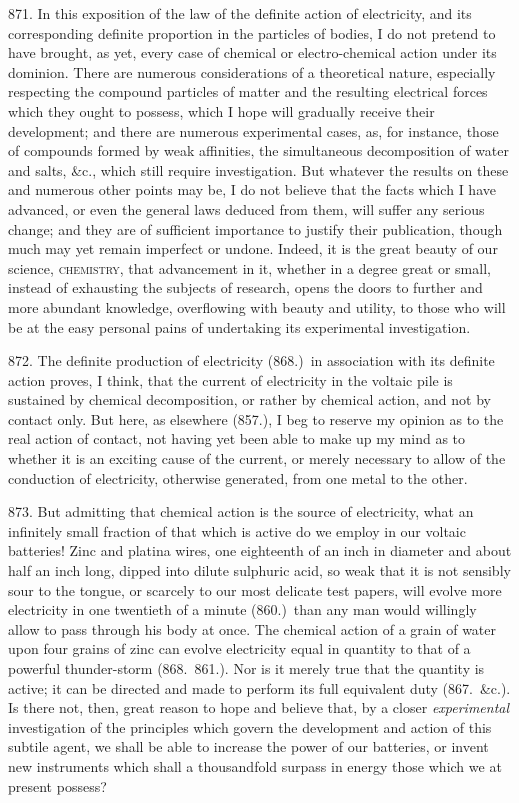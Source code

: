 871. In this exposition of the law of the definite action of
electricity, and its cor\-re\-spond\-ing definite proportion in the particles
of bodies, I do not pretend to have brought, as yet, every case of
chemical or electro-chemical action under its dominion. There are
numerous considerations of a theoretical nature, especially respecting
the compound particles of matter and the resulting electrical forces
which they ought to possess, which I hope will gradually receive their
development; and there are numerous experimental cases, as, for
instance, those of compounds formed by weak affinities, the simultaneous
de\-com\-po\-si\-tion of water and salts, \&c., which still require
investigation. But whatever the results on these and numerous other
points may be, I do not believe that the facts which I have advanced, or
even the general laws deduced from them, will suffer any serious change;
and they are of sufficient importance to justify their publication,
though much may yet remain imperfect or undone. Indeed, it is the great
beauty of our science, \textsc{chemistry}, that advancement in it,
whether in a degree great or small, instead of exhausting the subjects
of research, opens the doors to further and more abundant knowledge,
overflowing with beauty and utility, to those who will be at the easy
personal pains of undertaking its experimental investigation.

872. The definite production of electricity (868.)\ in association with
its definite action proves, I think, that the current of electricity in
the voltaic pile is sustained by chemical de\-com\-po\-si\-tion, or rather by
chemical action, and not by contact only. But here, as elsewhere (857.),
I beg to reserve my opinion as to the real action of contact, not having
yet been able to make up my mind as to whether it is an exciting cause
of the current, or merely necessary to allow of the conduction of
electricity, otherwise generated, from one metal to the other.

873. But admitting that chemical action is the source of electricity,
what an infinitely small fraction of that which is active do we employ
in our voltaic batteries! Zinc and platina wires, one eighteenth of an
inch in diameter and about half an inch long, dipped into dilute
sulphuric acid, so weak that it is not sensibly sour to the tongue, or
scarcely to our most delicate test papers, will evolve more electricity
in one twentieth of a minute (860.)\ than any man would willingly allow
to pass through his body at once. The chemical action of a grain of
water upon four grains of zinc can evolve electricity equal in quantity
to that of a powerful thunder-storm (868.\ 861.). Nor is it merely true
that the quantity is active; it can be directed and made to perform its
full equivalent duty (867.\ \&c.). Is there not, then, great reason to
hope and believe that, by a closer \emph{experimental} investigation of
the principles which govern the development and action of this subtile
agent, we shall be able to increase the power of our batteries, or
invent new instruments which shall a thousandfold surpass in energy
those which we at present possess?

